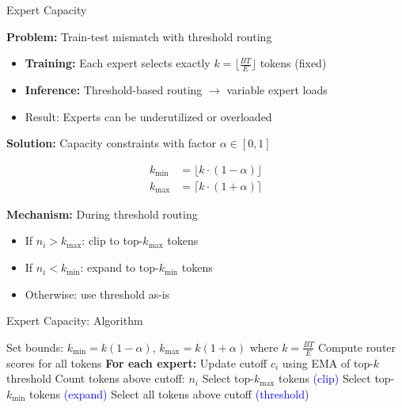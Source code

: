 \documentclass{beamer}
\begin{document}
\begin{frame}{Expert Capacity}

\textbf{Problem:} Train-test mismatch with threshold routing

\vspace{0.3cm}

\begin{itemize}
    \item \textbf{Training:} Each expert selects exactly $k = \lfloor \frac{BT}{E} \rfloor$ tokens (fixed)
    \item \textbf{Inference:} Threshold-based routing $\rightarrow$ variable expert loads
    \item Result: Experts can be underutilized or overloaded
\end{itemize}

\vspace{0.4cm}

\textbf{Solution:} Capacity constraints with factor $\alpha \in [0,1]$ 

\vspace{0.2cm}

\begin{align*}
k_{\min} &= \lfloor k \cdot (1 - \alpha) \rfloor \\
k_{\max} &= \lceil k \cdot (1 + \alpha) \rceil
\end{align*}

\vspace{0.2cm}

\textbf{Mechanism:} During threshold routing
\begin{itemize}
    \item If $n_i > k_{\max}$: clip to top-$k_{\max}$ tokens
    \item If $n_i < k_{\min}$: expand to top-$k_{\min}$ tokens
    \item Otherwise: use threshold as-is
\end{itemize}

\end{frame}

\begin{frame}{Expert Capacity: Algorithm}

\small
\begin{algorithmic}[1]
\STATE Set bounds: $k_{\min} = k(1-\alpha)$, $k_{\max} = k(1+\alpha)$ where $k = \frac{BT}{E}$
\STATE Compute router scores for all tokens
\STATE
\STATE \textbf{For each expert:}
\STATE \quad Update cutoff $c_i$ using EMA of top-$k$ threshold
\STATE \quad Count tokens above cutoff: $n_i$
\STATE \quad Select top-$k_{\max}$ tokens \textcolor{blue}{(clip)}
\STATE \quad Select top-$k_{\min}$ tokens \textcolor{blue}{(expand)}
\ELSE
\STATE \quad Select all tokens above cutoff \textcolor{blue}{(threshold)}
\ENDIF
\end{algorithmic}

\end{frame}
\end{document}
